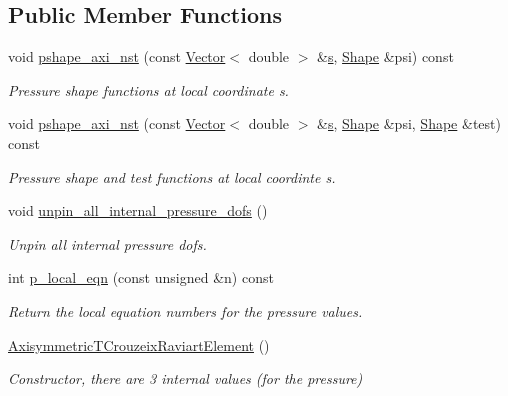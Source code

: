 \subsection*{Public Member Functions}
\begin{DoxyCompactItemize}
\item 
void \hyperlink{classoomph_1_1AxisymmetricTCrouzeixRaviartElement_afd3664b820b924b9509f4f75eaf7420c}{pshape\+\_\+axi\+\_\+nst} (const \hyperlink{classoomph_1_1Vector}{Vector}$<$ double $>$ \&\hyperlink{cfortran_8h_ab7123126e4885ef647dd9c6e3807a21c}{s}, \hyperlink{classoomph_1_1Shape}{Shape} \&psi) const
\begin{DoxyCompactList}\small\item\em Pressure shape functions at local coordinate s. \end{DoxyCompactList}\item 
void \hyperlink{classoomph_1_1AxisymmetricTCrouzeixRaviartElement_adb45e981a3fbe7894f14264bd13e1b7f}{pshape\+\_\+axi\+\_\+nst} (const \hyperlink{classoomph_1_1Vector}{Vector}$<$ double $>$ \&\hyperlink{cfortran_8h_ab7123126e4885ef647dd9c6e3807a21c}{s}, \hyperlink{classoomph_1_1Shape}{Shape} \&psi, \hyperlink{classoomph_1_1Shape}{Shape} \&test) const
\begin{DoxyCompactList}\small\item\em Pressure shape and test functions at local coordinte s. \end{DoxyCompactList}\item 
void \hyperlink{classoomph_1_1AxisymmetricTCrouzeixRaviartElement_adddc2d573af0f1df2407870a5c59b26d}{unpin\+\_\+all\+\_\+internal\+\_\+pressure\+\_\+dofs} ()
\begin{DoxyCompactList}\small\item\em Unpin all internal pressure dofs. \end{DoxyCompactList}\item 
int \hyperlink{classoomph_1_1AxisymmetricTCrouzeixRaviartElement_af9acbebdb665021f80bf849904f52c7c}{p\+\_\+local\+\_\+eqn} (const unsigned \&n) const
\begin{DoxyCompactList}\small\item\em Return the local equation numbers for the pressure values. \end{DoxyCompactList}\item 
\hyperlink{classoomph_1_1AxisymmetricTCrouzeixRaviartElement_a0d98aaabc1f686dc26a6028c6d993dc3}{Axisymmetric\+T\+Crouzeix\+Raviart\+Element} ()
\begin{DoxyCompactList}\small\item\em Constructor, there are 3 internal values (for the pressure) \end{DoxyCompactList}\item 

\end{DoxyCompactItemize}
